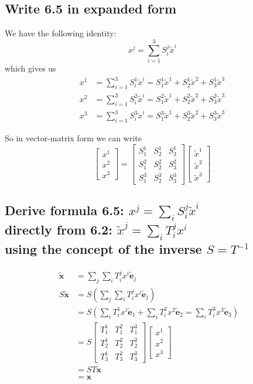 \documentclass{article}
\begin{document}
\subsection{Write 6.5 in expanded form}
We have the following identity:
$$x^j = \sum_{i=1}^3 S_i^j \tilde{x}^i $$
which gives us
\begin{align*}
	x^1 &= \sum_{i=1}^3 S_i^1 \tilde{x}^i = S^1_1 \tilde{x}^1 + S^1_2 \tilde{x}^2 + S_3^1 \tilde{x}^3\\
	x^2 &= \sum_{i=1}^3 S_i^2 \tilde{x}^i = S_1^2 \tilde{x}^1 + S_2^2 \tilde{x}^2 + S_3^2 \tilde{x}^3\\
	x^3 &= \sum_{i=1}^3 S_i^3 \tilde{x}^i = S_1^3 \tilde{x}^1 + S_2^3 \tilde{x}^2 + S_3^3 \tilde{x}^3
\end{align*}

So in vector-matrix form we can write
$$\begin{bmatrix}
	x^1 \\ x^2 \\ x^3 
\end{bmatrix} =
\begin{bmatrix}
	S^1_1 & S^1_2 & S^1_3 \\
	S^2_1 & S^2_2 & S^2_3 \\
	S^3_1 & S^3_2 & S^3_3
\end{bmatrix}
\begin{bmatrix}
	\tilde{x}^1 \\ \tilde{x}^2 \\ \tilde{x}^3
\end{bmatrix}
$$

\subsection{Derive formula 6.5: $x^j = \sum_i S^j_i \tilde{x}^i$ \\directly from 6.2: $\tilde{x}^j = \sum_i T^j_i x^i$
\\using the concept of the inverse $S = T^{-1}$}

\begin{align*}
	\tilde{\mathbf{x}} &= \sum_j \sum_i T^j_i x^i \tilde{\mathbf{e}}_j &\\
	S\tilde{\mathbf{x}} &= S\left(\sum_j \sum_i T^j_i x^i \tilde{\mathbf{e}}_j\right) &\\
	&= S\left(\sum_i T^1_ix^i\tilde{\mathbf{e}}_1 + \sum_i T^2_i x^2 \tilde{\mathbf{e}}_2 = \sum_i T^3_i x^3 \tilde{\mathbf{e}}_3\right) &\\
	&=S\begin{bmatrix}
		T^1_1 & T^2_1 & T^3_1 \\
		T^1_2 & T^2_2 & T^3_2 \\
		T^1_3 & T^2_3 & T^3_3
	\end{bmatrix}
	\begin{bmatrix}
		x^1 \\ x^2 \\ x^3
	\end{bmatrix} &\\
	&=ST\mathbf{x} &\\
	&=\mathbf{x}
\end{align*}
\end{document}
